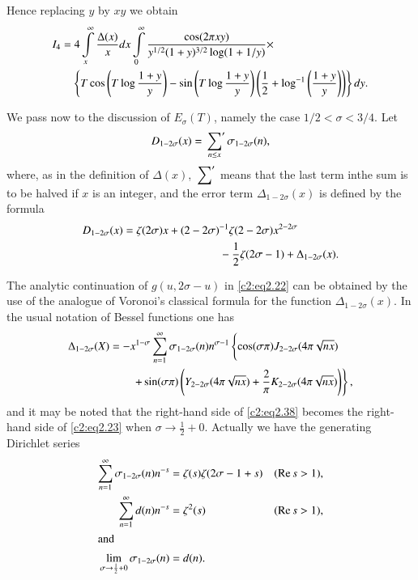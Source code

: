 Hence replacing $y$ by $xy$ we obtain
\begin{align}
  I_4 & = 4 \int\limits_x^\infty \frac{\Delta (x)}{x} dx
  \int\limits_0^\infty \frac{\cos (2 \pi xy)}{y^{1/2}(1+y)^{3/2} \log
    (1+ 1/y)}\times\notag\\
  &\quad \left\{T \cos \left(T \log \frac{1 + y}{y}\right)- \sin \left( T
  \log \frac{1+y}{y}\right) \left(\frac{1}{2}+ \log^{-1}
  \left(\frac{1+y}{y} \right)  \right)\right\}dy.\label{c2:eq2.35}
\end{align}

We pass now to the discussion of $E_\sigma(T)$, namely the case $1/2<
\sigma < 3/4$. Let
\begin{equation}
  D_{1- 2 \sigma} (x) = \sideset{}{'}\sum_{n\leq x} \sigma_{1- 2
    \sigma} (n),\label{c2:eq2.36}
\end{equation}
where, as in the definition of $\Delta  (x)$, $\sideset{}{'}\sum$
means that the last term in\pageoriginale the sum is to be halved if
$x$ is an integer, and the error term $\Delta _{1- 2 \sigma} (x)$ is
defined by the formula
\begin{align}
  D_{1- 2 \sigma}(x) & = \zeta (2 \sigma) x+ (2- 2 \sigma)^{-1} \zeta
  (2- 2 \sigma)x^{2- 2\sigma}\notag\\
  & \hspace{3cm}- \frac{1}{2} \zeta (2 \sigma -1) +
  \Delta _{1- 2 \sigma}(x).\label{c2:eq2.37}
\end{align}

The analytic continuation of $g(u, 2 \sigma -u)$ in \eqref{c2:eq2.22}
  can be obtained by the use of the analogue of Voronoi's classical
  formula for the function $\Delta _{1- 2 \sigma}(x)$. In the usual
  notation of Bessel functions one has
{\fontsize{10}{12}\selectfont
\begin{align}
  \Delta _{1- 2 \sigma} (X)  &=- x^{1-\sigma} \sum_{n=1}^\infty
  \sigma_{1- 2 \sigma} (n) n^{\sigma-1} \label{c2:eq2.38}\left\{\cos
  (\sigma \pi) J_{2- 2\sigma} (4 \pi \sqrt{n x})\vphantom{\frac{2}{\pi}}\right.\\ 
  &\qquad\left. + \sin
  (\sigma \pi) \left(Y_{2- 2\sigma} (4 \pi \sqrt{nx}) + \frac{2}{\pi} K_{2-
  2\sigma} (4 \pi \sqrt{nx})\right) \right\},\notag
\end{align}}
and it may be noted that the right-hand side of \eqref{c2:eq2.38}
becomes the right-hand side of \eqref{c2:eq2.23} when $\sigma \to
\frac{1}{2} + 0$. Actually we have the generating Dirichlet series
\begin{align*}
  \sum_{n=1}^\infty \sigma_{1- 2 \sigma} (n) n^{-s} & = \zeta (s)
  \zeta (2 \sigma - 1+s) & (\operatorname{Re} s > 1),\\
  \sum_{n=1}^\infty d(n) n^{-s} & = \zeta^2 (s) & (\operatorname{Re} s > 1),\\
  \intertext{and}
  \lim\limits_{\sigma \to \frac{1}{2} + 0} \sigma_{1- 2 \sigma}(n) & = d(n). 
\end{align*}

